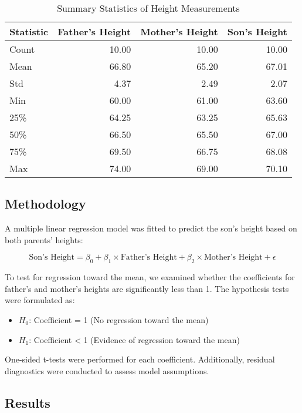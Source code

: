 \documentclass[12pt]{article}
\begin{document}
\begin{table}[H]
\centering
\caption{Summary Statistics of Height Measurements}
\begin{tabular}{lrrr}
\toprule
Statistic & Father's Height & Mother's Height & Son's Height \\
\midrule
Count & 10.00 & 10.00 & 10.00 \\
Mean & 66.80 & 65.20 & 67.01 \\
Std & 4.37 & 2.49 & 2.07 \\
Min & 60.00 & 61.00 & 63.60 \\
25\% & 64.25 & 63.25 & 65.63 \\
50\% & 66.50 & 65.50 & 67.00 \\
75\% & 69.50 & 66.75 & 68.08 \\
Max & 74.00 & 69.00 & 70.10 \\
\bottomrule
\end{tabular}
\end{table}

\subsection{Methodology}
A multiple linear regression model was fitted to predict the son's height based on both parents' heights:

\begin{equation}
\text{Son's Height} = \beta_0 + \beta_1 \times \text{Father's Height} + \beta_2 \times \text{Mother's Height} + \epsilon
\end{equation}

To test for regression toward the mean, we examined whether the coefficients for father's and mother's heights are significantly less than 1. The hypothesis tests were formulated as:

\begin{itemize}
    \item $H_0$: Coefficient = 1 (No regression toward the mean)
    \item $H_1$: Coefficient < 1 (Evidence of regression toward the mean)
\end{itemize}

One-sided t-tests were performed for each coefficient. Additionally, residual diagnostics were conducted to assess model assumptions.

\subsection{Results}
\end{document}
